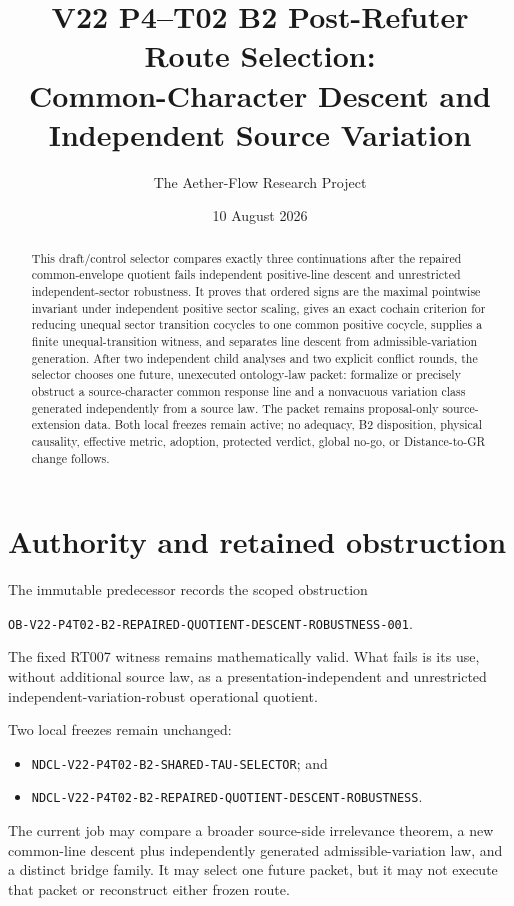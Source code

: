 \documentclass[11pt]{article}
\title{V22 P4--T02 B2 Post-Refuter Route Selection:\\
Common-Character Descent and Independent Source Variation}
\author{The Aether-Flow Research Project}
\date{10 August 2026}
\begin{document}
\maketitle

\begin{abstract}
This draft/control selector compares exactly three continuations after the
repaired common-envelope quotient fails independent positive-line descent and
unrestricted independent-sector robustness.  It proves that ordered signs are
the maximal pointwise invariant under independent positive sector scaling,
gives an exact cochain criterion for reducing unequal sector transition
cocycles to one common positive cocycle, supplies a finite unequal-transition
witness, and separates line descent from admissible-variation generation.
After two independent child analyses and two explicit conflict rounds, the
selector chooses one future, unexecuted ontology-law packet: formalize or
precisely obstruct a source-character common response line and a nonvacuous
variation class generated independently from a source law.  The packet remains
proposal-only source-extension data.  Both local freezes remain active; no
adequacy, B2 disposition, physical causality, effective metric, adoption,
protected verdict, global no-go, or Distance-to-GR change follows.
\end{abstract}

\section{Authority and retained obstruction}

The immutable predecessor records the scoped obstruction
\begin{center}
\small\nolinkurl{OB-V22-P4T02-B2-REPAIRED-QUOTIENT-DESCENT-ROBUSTNESS-001}.
\end{center}
The fixed RT007 witness remains mathematically valid.  What fails is its use,
without additional source law, as a presentation-independent and unrestricted
independent-variation-robust operational quotient.

Two local freezes remain unchanged:
\begin{itemize}
  \item \nolinkurl{NDCL-V22-P4T02-B2-SHARED-TAU-SELECTOR}; and
  \item \nolinkurl{NDCL-V22-P4T02-B2-REPAIRED-QUOTIENT-DESCENT-ROBUSTNESS}.
\end{itemize}

The current job may compare a broader source-side irrelevance theorem, a new
common-line descent plus independently generated admissible-variation law, and
a distinct bridge family.  It may select one future packet, but it may not
execute that packet or reconstruct either frozen route.
\end{document}
